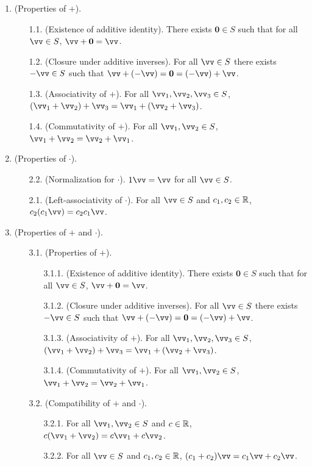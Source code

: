 \begin{defn}
    \begin{enumerate}
        \item (Properties of $+$).
        \begin{enumerate}
                \item[1.1.] (Existence of additive identity). There exists $\mathbf{0} \in S$ such that for all $\vv \in S$, $\vv + \mathbf{0} = \vv$.
                \item[1.2.] (Closure under additive inverses). For all $\vv \in S$ there exists $-\vv \in S$ such that $\vv + (-\vv) = \mathbf{0} = (-\vv) + \vv$.
                \item[1.3.] (Associativity of $+$). For all $\vv_1, \vv_2, \vv_3 \in S$, $(\vv_1 + \vv_2) + \vv_3 = \vv_1 + (\vv_2 + \vv_3)$.
                \item[1.4.] (Commutativity of $+$). For all $\vv_1, \vv_2 \in S$, $\vv_1 + \vv_2 = \vv_2 + \vv_1$.
            \end{enumerate}
        \item (Properties of $\cdot$).
        \begin{enumerate}
            \item[2.2.] (Normalization for $\cdot$). $1 \vv = \vv$ for all $\vv \in S$.
            \item[2.1.] (Left-associativity of $\cdot$). For all $\vv \in S$ and $c_1, c_2 \in \mathbb{R}$, $c_2 (c_1 \vv) = c_2 c_1 \vv$.
        \end{enumerate}
        \item (Properties of $+$ and $\cdot$).
        \begin{enumerate}
            \item[3.1.] (Properties of $+$).
            \begin{enumerate}
                \item[3.1.1.] (Existence of additive identity). There exists $\mathbf{0} \in S$ such that for all $\vv \in S$, $\vv + \mathbf{0} = \vv$.
                \item[3.1.2.] (Closure under additive inverses). For all $\vv \in S$ there exists $-\vv \in S$ such that $\vv + (-\vv) = \mathbf{0} = (-\vv) + \vv$.
                \item[3.1.3.] (Associativity of $+$). For all $\vv_1, \vv_2, \vv_3 \in S$, $(\vv_1 + \vv_2) + \vv_3 = \vv_1 + (\vv_2 + \vv_3)$.
                \item[3.1.4.] (Commutativity of $+$). For all $\vv_1, \vv_2 \in S$, $\vv_1 + \vv_2 = \vv_2 + \vv_1$.
            \end{enumerate}
            \item[3.2.] (Compatibility of $+$ and $\cdot$).
            \begin{enumerate}
                \item[3.2.1.] For all $\vv_1, \vv_2 \in S$ and $c \in \mathbb{R}$, $c(\vv_1 + \vv_2) = c \vv_1 + c \vv_2$.
                \item[3.2.2.] For all $\vv \in S$ and $c_1, c_2 \in \mathbb{R}$, $(c_1 + c_2)\vv = c_1 \vv + c_2 \vv$.
            \end{enumerate}
        \end{enumerate}
    \end{enumerate}
    

\end{defn}

